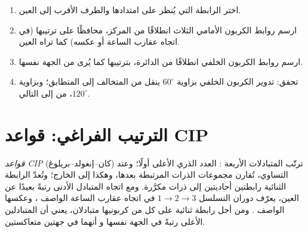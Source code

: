 \begin{method}\label{met:b1:stereochemistry-in-depth:newman-from-cram}
\begin{enumerate}
  \item اختر الرابطة التي يُنظر على امتدادها والطرف الأقرب إلى العين.
  \item ارسم روابط الكربون الأمامي الثلاث انطلاقًا من المركز،
        محافظًا على ترتيبها (في اتجاه عقارب الساعة أو عكسه) كما تراه
        العين.
  \item ارسم روابط الكربون الخلفي انطلاقًا من الدائرة، بترتيبها كما
        يُرى من الجهة نفسها.
  \item تحقق: تدوير الكربون الخلفي بزاوية $60^\circ$ ينقل من
        المتخالف إلى المتطابق؛ وبزاوية $120^\circ$، من 
        إلى التالي.
\end{enumerate}
\end{method}

\section{الترتيب الفراغي: قواعد CIP}

\begin{definition}\label{def:b1:stereochemistry-in-depth:cip}
\emph{قواعد CIP} (كان--إنغولد--بريلوغ) ترتّب
المتبادلات الأربعة : العدد الذري الأعلى أولًا؛ وعند
التساوي، تُقارن مجموعات الذرات المرتبطة بعدها، وهكذا إلى الخارج؛
وتُعدّ الرابطة الثنائية رابطتين أحاديتين إلى ذرات مكرَّرة. ومع
اتجاه المتبادل الأدنى رتبةً بعيدًا عن العين، يعرّف دوران التسلسل
$1 \to 2 \to 3$ في اتجاه عقارب الساعة الواصف ،
وعكسها الواصف . ومن أجل رابطة ثنائية على كل من كربونيها متبادلان،
يعني  أن المتبادلين الأعلى رتبةً في الجهة نفسها
و أنهما في جهتين متعاكستين.
\end{definition}

